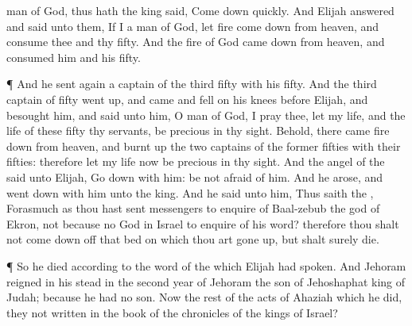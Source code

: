 {man of
God, thus hath the
king
said, Come
down
quickly.
And
Elijah
answered and
said unto them, If I
{} a
man of
God, let
fire come
down from
heaven, and
consume thee and thy
fifty. And the
fire of
God came
down from
heaven, and
consumed him and his
fifty.
\par }{\PP {}¶ And he
sent
again a
captain of the
third
fifty with his
fifty. And the
third
captain of
fifty went
up, and
came and
fell on his
knees
before
Elijah, and
besought him, and
said unto him, O
man of
God, I pray thee, let my
life, and the
life of these
fifty thy
servants, be
precious in thy
sight.
Behold, there
came
fire
down from
heaven, and burnt
up the
two
captains of the
former
fifties with their
fifties: therefore let my
life now be
precious in thy
sight.
And the
angel of the
{}
said unto
Elijah, Go
down with him: be not
afraid of
him. And he
arose, and went
down with him unto the
king.
And he
said unto him, Thus
saith the
{}, Forasmuch as thou hast
sent
messengers to
enquire of
Baal-zebub the
god of
Ekron,
{} not because
{} no
God in
Israel to
enquire of his
word? therefore thou shalt not come
down off that
bed on which thou art gone
up, but shalt
surely
die.
\par }{\PP {}¶ So he
died according to the
word of the
{} which
Elijah had
spoken. And
Jehoram
reigned in his stead in the
second
year of
Jehoram the
son of
Jehoshaphat
king of
Judah; because he had no
son.
Now the
rest of the
acts of
Ahaziah which he
did,
{} they not
written in the
book of the
chronicles of the
kings of
Israel?

}
